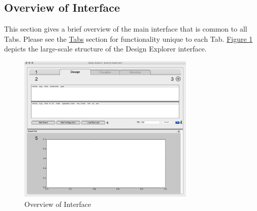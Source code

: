 \documentclass[10pt]{article}
\begin{document}
	\subsection{Overview of Interface}
	\label{subsec:overview}
		This section gives a brief overview of the main interface that is common to all Tabs.
		Please see the \hyperref[subsec:tabs]{Tabs} section for functionality unique to each Tab.
		\hyperref[fig:overview]{Figure \ref{fig:overview}} depicts the large-scale structure of the Design Explorer interface.
		\begin{figure}[ht]
			\centering
			\includegraphics[width=0.75\textwidth,frame]{fig/2_overview.jpg}
			\caption{Overview of Interface}
			\label{fig:overview}
		\end{figure}
\end{document}
